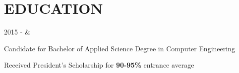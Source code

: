 \documentclass[]{richard-dang}
\begin{document}
\section*{\faMortarBoard \hspace{\FAspace} EDUCATION}
\begin{tabularcv}
    2015 -    &   
                    \begin{tabitemize}
                        \item Candidate for Bachelor of Applied Science Degree in Computer Engineering
                        \item Received President’s Scholarship for \textbf{90-95\%} entrance average
                    \end{tabitemize} 
                    \\[\vspacepar] 
\end{tabularcv}
\end{document}
